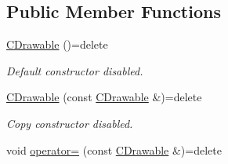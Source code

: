 \subsection*{Public Member Functions}
\begin{DoxyCompactItemize}
\item 
\hyperlink{class_c_drawable_abd46d61baf3d5f5210aa3c66b98d9263}{C\+Drawable} ()=delete
\begin{DoxyCompactList}\small\item\em Default constructor disabled. \end{DoxyCompactList}\item 
\hypertarget{class_c_drawable_abec99c088c1a7c12e1d7ecae69135602}{\hyperlink{class_c_drawable_abec99c088c1a7c12e1d7ecae69135602}{C\+Drawable} (const \hyperlink{class_c_drawable}{C\+Drawable} \&)=delete}\label{class_c_drawable_abec99c088c1a7c12e1d7ecae69135602}

\begin{DoxyCompactList}\small\item\em Copy constructor disabled. \end{DoxyCompactList}\item 
\hypertarget{class_c_drawable_aabd5f52b903e57a4c8b145cb69158adb}{void \hyperlink{class_c_drawable_aabd5f52b903e57a4c8b145cb69158adb}{operator=} (const \hyperlink{class_c_drawable}{C\+Drawable} \&)=delete}\label{class_c_drawable_aabd5f52b903e57a4c8b145cb69158adb}


\end{DoxyCompactItemize}
